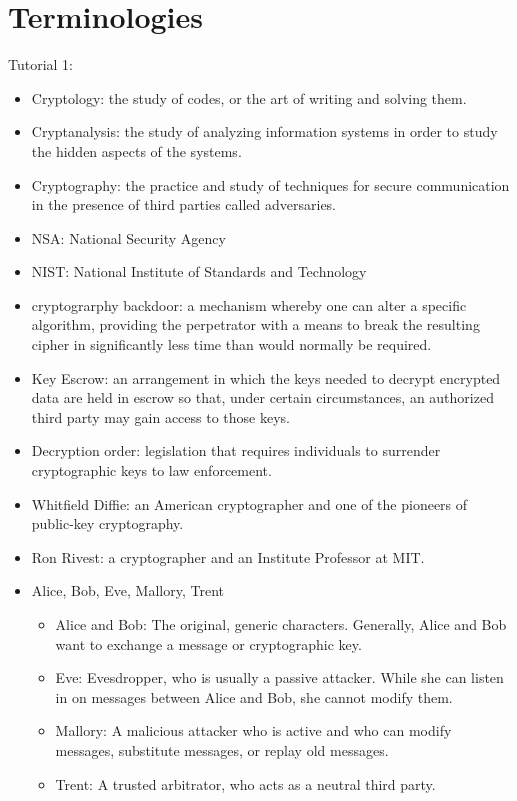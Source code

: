 \documentclass[12pt]{article}
\theoremstyle{definition}
\begin{document}
\section{Terminologies}
Tutorial 1:\\
\begin{itemize}
  \item Cryptology: the study of codes, or the art of writing and solving them.
  \item Cryptanalysis: the study of analyzing information systems in order to study the hidden aspects of the systems.
  \item Cryptography: the practice and study of techniques for secure communication in the presence of third parties called adversaries.
  \item NSA: National Security Agency
  \item NIST: National Institute of Standards and Technology
  \item cryptograrphy backdoor: a mechanism whereby one can alter a specific algorithm,  providing the perpetrator with a means to break the resulting cipher in significantly less time than would normally be required.
  \item Key Escrow: an arrangement in which the keys needed to decrypt encrypted data are held in escrow so that, under certain circumstances, an authorized third party may gain access to those keys. 
  \item Decryption order:  legislation that requires individuals to surrender cryptographic keys to law enforcement.
  \item Whitfield Diffie: an American cryptographer and one of the pioneers of public-key cryptography.
  \item Ron Rivest: a cryptographer and an Institute Professor at MIT.
  \item Alice, Bob, Eve, Mallory, Trent
  \begin{itemize}
    \item Alice and Bob: The original, generic characters. Generally, Alice and Bob want to exchange a message or cryptographic key.
    \item Eve: Evesdropper, who is usually a passive attacker. While she can listen in on messages between Alice and Bob, she cannot modify them. 
    \item Mallory: A malicious attacker who is active and who can modify messages, substitute messages, or replay old messages.
    \item Trent:  A trusted arbitrator, who acts as a neutral third party.
  \end{itemize}
\end{itemize}
\end{document}
